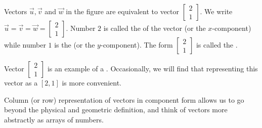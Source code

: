 \documentclass{ximera}
\begin{document}
\begin{center}
\end{center}



Vectors $\vec{u}, \vec{v}$ and $\vec{w}$ in the figure are equivalent to vector $\begin{bmatrix}2\\1\end{bmatrix}$.  We write $\vec{u}=\vec{v}=\vec{w}=\begin{bmatrix}2\\1\end{bmatrix}$.  Number $2$ is called the  of the vector (or the $x$-component) while number $1$ is the  (or the $y$-component).  The form $\begin{bmatrix}2\\1\end{bmatrix}$ is called the .  

Vector $\begin{bmatrix}2\\1\end{bmatrix}$ is an example of a .  Occasionally, we will find that representing this vector as a  $[2, 1]$ is more convenient.

Column (or row) representation of vectors in component form allows us to go beyond the physical and geometric definition, and think of vectors more abstractly as arrays of numbers.
\end{document}
